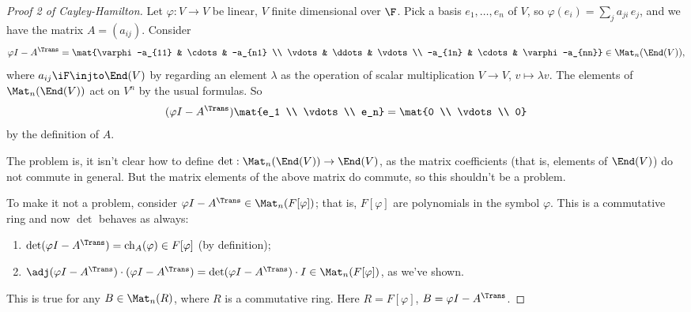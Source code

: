 \begin{proof}
	[Proof 2 of Cayley-Hamilton] Let $\varphi:V\to V$ be linear, $V$  finite dimensional over $\F$. Pick a basis $e_1,\ldots,e_n$ of $V$, so $\varphi(e_i) = \sum_j a_{ji}\,e_j$, and we have the matrix $A=(a_{ij})$. Consider
	\begin{equation*}
		\varphi I - A^\Trans =
		\mat{\varphi-a_{11} & \cdots & -a_{n1} \\ \vdots & \ddots & \vdots \\ -a_{1n} & \cdots & \varphi-a_{nn}} \in {\Mat}_n(\End(V)),
	\end{equation*}
	where $a_{ij}\iF \injto \End(V)$ by regarding an element $\lambda$ as the operation of scalar multiplication $V \to V$, $v \mapsto \lambda v$.
	The elements of $\Mat_n(\End(V))$ act on $V^n$ by the usual formulas. So
	\begin{equation*}
		(\varphi I-A^\Trans)
		\mat{e_1 \\ \vdots \\ e_n}
		=
		\mat{0 \\ \vdots \\ 0}
	\end{equation*}
	by the definition of $A$.
	
	The problem is, it isn't clear how to define $\det:\Mat_n(\End(V)) \to \End(V)$, as the matrix coefficients (that is, elements of $\End(V)$) do not commute in general. But the matrix elements of the above matrix do commute, so this shouldn't be a problem.
	
	To make it not a problem, consider $\varphi I-A^\Trans\in\Mat_n(F[\varphi])$; that is, $F[\varphi]$ are polynomials in the symbol $\varphi$. This is a commutative ring and now $\det$ behaves as always:%
	\begin{enumerate}
		\shortskip
		\item $\det(\varphi I-A^\Trans) = \chi_A(\varphi)\in F[\varphi]$ (by definition);
		\item $\adj(\varphi I-A^\Trans) \cdot (\varphi I-A^\Trans) = \det(\varphi I - A^\Trans) \cdot I \in \Mat_n(F[\varphi])$, as we've shown.
	\end{enumerate}
	This is true for any $B\in\Mat_n(R)$, where $R$ is a commutative ring.  Here $R=F[\varphi]$, $B=\varphi I-A^\Trans$.
	

\end{proof}
